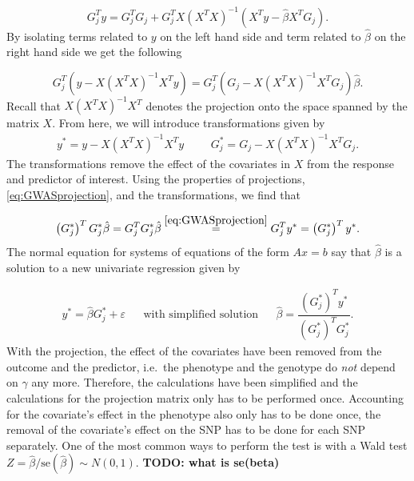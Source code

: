 \begin{equation}
	G^T_j y = G_j^TG_j + G_j^TX (X^TX)^{-1}(X^Ty - \hat{\beta} X^TG_j).
\end{equation}
By isolating terms related to $ y $ on the left hand side and term related to $ \hat{\beta} $ on the right hand side we get the following

\begin{equation} \label{eq:GWASprojection}
	G_j^T(y - X(X^TX)^{-1}X^Ty) = G_j^T(G_j - X(X^TX)^{-1}X^TG_j) \hat{\beta}.
\end{equation}
Recall that $ X(X^TX)^{-1}X^T $ denotes the projection onto the space spanned by the matrix $ X $. From here, we will introduce transformations given by 
\begin{align}
	y^\ast = y - X(X^TX)^{-1}X^Ty & & & G_j^{\ast} = G_j - X(X^TX)^{-1}X^TG_j.
\end{align}
The transformations remove the effect of the covariates in $ X $ from the response and predictor of interest. Using the properties of projections, \cref{eq:GWASprojection}, and the transformations, we find that 

\begin{equation}
	\left( G_j^{\ast} \right)^T G_j^{\ast} \hat{\beta} = G_j^T G_j^{\ast} \hat{\beta} \stackrel{\ref{eq:GWASprojection}}{=} G_j^T y^{\ast} = \left( G_j^{\ast} \right)^T y^{\ast}.
\end{equation}
The normal equation for systems of equations of the form $ Ax=b $ say that $ \hat{\beta} $ is a solution to a new univariate regression given by

\begin{align}\label{eq:univarGWAS}
	y^\ast = \hat{\beta} G_j^{\ast} + \varepsilon&   &\text{with simplified solution}&  &\hat{\beta} = \dfrac{\left( G_j^{\ast} \right)^T y^{\ast}}{\left( G_j^{\ast} \right)^T G_j^{\ast}}.
\end{align}
With the projection, the effect of the covariates have been removed from the outcome and the predictor, i.e.\ the phenotype and the genotype do \textit{not} depend on $ \gamma $ any more. Therefore, the calculations have been simplified and the calculations for the projection matrix only has to be performed once. Accounting for the covariate's effect in the phenotype also only has to be done once, the removal of the covariate's effect on the SNP has to be done for each SNP separately.
One of the most common ways to perform the test is with a Wald test $ Z = \hat{\beta}/\text{se}(\hat{\beta}) \sim N(0,1)$. 
\textbf{TODO: what is se(beta)}



